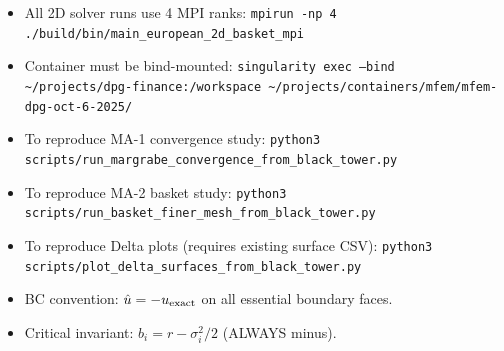 \documentclass[11pt,a4paper]{article}
\begin{document}
\begin{itemize}
  \item All 2D solver runs use 4 MPI ranks:
    \texttt{mpirun -np 4 ./build/bin/main\_european\_2d\_basket\_mpi}
  \item Container must be bind-mounted:
    \texttt{singularity exec --bind \textasciitilde/projects/dpg-finance:/workspace \textasciitilde/projects/containers/mfem/mfem-dpg-oct-6-2025/}
  \item To reproduce MA-1 convergence study:
    \texttt{python3 scripts/run\_margrabe\_convergence\_from\_black\_tower.py}
  \item To reproduce MA-2 basket study:
    \texttt{python3 scripts/run\_basket\_finer\_mesh\_from\_black\_tower.py}
  \item To reproduce Delta plots (requires existing surface CSV):
    \texttt{python3 scripts/plot\_delta\_surfaces\_from\_black\_tower.py}
  \item BC convention: $\hat{u} = -u_{\rm exact}$ on all essential boundary faces.
  \item Critical invariant: $b_i = r - \sigma_i^2/2$ (ALWAYS minus).
\end{itemize}
\end{document}

